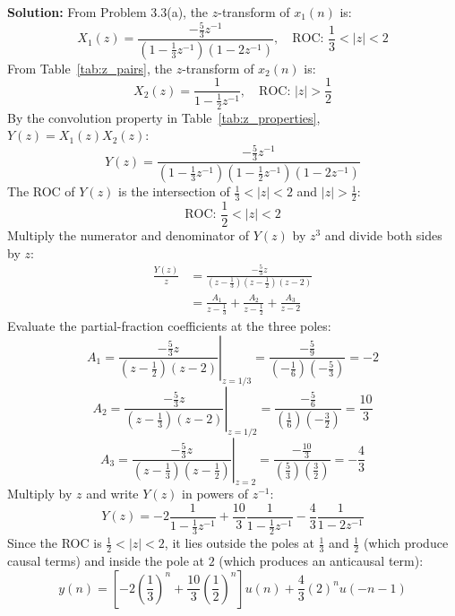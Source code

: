 \documentclass[12pt,a4paper]{article}
\begin{document}
\textbf{Solution:}
From Problem 3.3(a), the $z$-transform of $x_1(n)$ is:
\[
X_1(z) = \frac{-\frac{5}{3}z^{-1}}{\left(1 - \frac{1}{3}z^{-1}\right)(1 - 2z^{-1})}, \quad \text{ROC: } \frac{1}{3} < |z| < 2
\]
From Table~\ref{tab:z_pairs}, the $z$-transform of $x_2(n)$ is:
\[
X_2(z) = \frac{1}{1 - \frac{1}{2}z^{-1}}, \quad \text{ROC: } |z| > \frac{1}{2}
\]
By the convolution property in Table~\ref{tab:z_properties}, $Y(z) = X_1(z)X_2(z)$:
\[
Y(z) = \frac{-\frac{5}{3}z^{-1}}{\left(1 - \frac{1}{3}z^{-1}\right)\left(1 - \frac{1}{2}z^{-1}\right)(1 - 2z^{-1})}
\]
The ROC of $Y(z)$ is the intersection of $\frac{1}{3} < |z| < 2$ and $|z| > \frac{1}{2}$:
\[
\text{ROC: } \frac{1}{2} < |z| < 2
\]
Multiply the numerator and denominator of $Y(z)$ by $z^3$ and divide both sides by $z$:
\[
\begin{aligned}
\frac{Y(z)}{z} &= \frac{-\frac{5}{3}z}{\left(z - \frac{1}{3}\right)\left(z - \frac{1}{2}\right)(z - 2)} \\
&= \frac{A_1}{z - \frac{1}{3}} + \frac{A_2}{z - \frac{1}{2}} + \frac{A_3}{z - 2}
\end{aligned}
\]
Evaluate the partial-fraction coefficients at the three poles:
\[
A_1 = \left. \frac{-\frac{5}{3}z}{\left(z - \frac{1}{2}\right)(z - 2)} \right|_{z = 1/3} = \frac{-\frac{5}{9}}{\left(-\frac{1}{6}\right)\left(-\frac{5}{3}\right)} = -2
\]
\[
A_2 = \left. \frac{-\frac{5}{3}z}{\left(z - \frac{1}{3}\right)(z - 2)} \right|_{z = 1/2} = \frac{-\frac{5}{6}}{\left(\frac{1}{6}\right)\left(-\frac{3}{2}\right)} = \frac{10}{3}
\]
\[
A_3 = \left. \frac{-\frac{5}{3}z}{\left(z - \frac{1}{3}\right)\left(z - \frac{1}{2}\right)} \right|_{z = 2} = \frac{-\frac{10}{3}}{\left(\frac{5}{3}\right)\left(\frac{3}{2}\right)} = -\frac{4}{3}
\]
Multiply by $z$ and write $Y(z)$ in powers of $z^{-1}$:
\[
Y(z) = -2\frac{1}{1 - \frac{1}{3}z^{-1}} + \frac{10}{3}\frac{1}{1 - \frac{1}{2}z^{-1}} - \frac{4}{3}\frac{1}{1 - 2z^{-1}}
\]
Since the ROC is $\frac{1}{2} < |z| < 2$, it lies outside the poles at $\frac{1}{3}$ and $\frac{1}{2}$ (which produce causal terms) and inside the pole at $2$ (which produces an anticausal term):
\[
y(n) = \left[-2\left(\frac{1}{3}\right)^n + \frac{10}{3}\left(\frac{1}{2}\right)^n\right]u(n) + \frac{4}{3}(2)^n u(-n - 1)
\]

\end{document}

